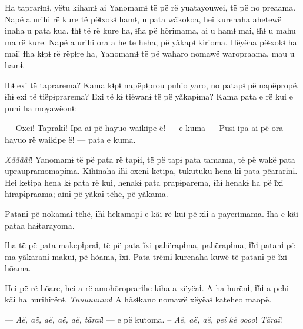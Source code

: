 Ha taprarɨnɨ, yëtu kihamɨ ai Yanomamɨ të pë rë yuatayouwei, të pë no
preaama. Napë a urihi rë kure të pëɨxokɨ hamɨ, u pata wãkokoa, hei
kurenaha ahetewë inaha u pata kua. Ɨhɨ të rë kure ha, ɨ̃ha pë hõrimama,
ai u hamɨ mai, ɨ̃hɨ u mahu ma rë kure. Napë a urihi ora a he te heha, pë
yãkapɨ kirioma. Hëyëha pëɨxokɨ ha mai! Ɨha kɨpɨ rë rëpɨre ha, Yanomamɨ
të pë waharo nomawë waropraama, mau u hamɨ. 

Ɨhɨ exi të taprarema? Kama kɨpɨ napëpɨprou puhio yaro, no patapɨ pë
napëpropë, ɨ̃hɨ exi të tiëpɨprarema? Exi të kɨ tiëwanɨ të pë yãkapɨma?
Kama pata e rë kui e puhi ha moyawëonɨ: 

--- Oxei! Taprakɨ! Ipa ai pë hayuo waikipe ë! --- e kuma --- Pusi ipa ai pë
ora hayuo rë waikipe ë! --- pata e kuma. 



\textit{Xããããi}! Yanomamɨ të pë pata rë tapɨi, të pë tapɨ pata tamama, të pë wakë
pata upraupramomapɨma. Kihinaha ɨ̃hɨ oxenɨ ketipa, tukutuku hena kɨ pata
pëararɨnɨ. Hei ketipa hena kɨ pata rë kui, henakɨ pata prapɨparema, ɨ̃hɨ
henakɨ ha pë ĩxi hirapɨpraama; ainɨ pë yãkaɨ tëhë, pë yãkama. 

Patanɨ pë nokamaɨ tëhë, ɨ̃hɨ hekamapɨ e kãi rë kui pë xɨɨ a payerimama.
Ɨha e kãi pataa haɨtarayoma. 

Ɨha të pë pata makepɨpraɨ, të pë pata ĩxi pahërapɨma, pahërapɨma, ɨ̃hɨ
patanɨ pë ma yãkaranɨ makui, pë hõama, ĩxi. Pata trëmɨ kurenaha kuwë të
patanɨ pë ĩxi hõama. 


Hei pë rë hõare, hei a rë amohõroprarɨhe kiha a xëyëaɨ. A ha hurënɨ, ɨ̃hɨ
a pehi kãi ha hurihirënɨ. \textit{Tuuuuuuuu}! A hãsɨkano nomawë xëyëaɨ kateheo
maopë. 

--- \textit{Aë, aë, aë, aë, aë, tãrai}! --- e pë kutoma. -- \textit{Aë, aë, aë, pei kë oooo}!
\textit{Tãrai}!

